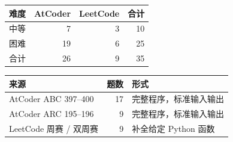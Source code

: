 \documentclass[11pt,a4paper,fontset=none]{ctexart}
\begin{document}
\begin{center}
\small
\begin{tabular}{@{}lrrr@{}}
\toprule
难度 & AtCoder & LeetCode & 合计 \\
\midrule
中等 & 7 & 3 & 10 \\
困难 & 19 & 6 & 25 \\
合计 & 26 & 9 & 35 \\
\bottomrule
\end{tabular}
\qquad
\begin{tabular}{@{}lrl@{}}
\toprule
来源 & 题数 & 形式 \\
\midrule
AtCoder ABC 397--400 & 17 & 完整程序，标准输入输出 \\
AtCoder ARC 195--196 & 9 & 完整程序，标准输入输出 \\
LeetCode 周赛 / 双周赛 & 9 & 补全给定 Python 函数 \\
\bottomrule
\end{tabular}
\end{center}
\end{document}
